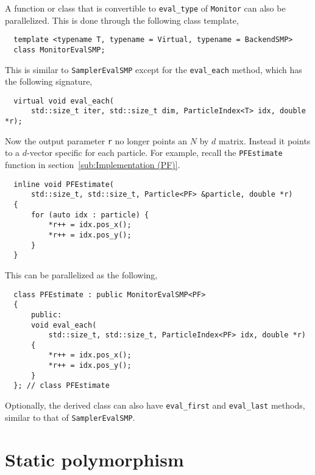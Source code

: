 A function or class that is convertible to \verb|eval_type| of \verb|Monitor|
can also be parallelized. This is done through the following class template,
\begin{Verbatim}
  template <typename T, typename = Virtual, typename = BackendSMP>
  class MonitorEvalSMP;
\end{Verbatim}
This is similar to \verb|SamplerEvalSMP| except for the \verb|eval_each|
method, which has the following signature,
\begin{Verbatim}
  virtual void eval_each(
      std::size_t iter, std::size_t dim, ParticleIndex<T> idx, double *r);
\end{Verbatim}
Now the output parameter \verb|r| no longer points an $N$ by $d$ matrix.
Instead it points to a $d$-vector specific for each particle. For example,
recall the \verb|PFEstimate| function in section~\ref{sub:Implementation (PF)}.
\begin{Verbatim}
  inline void PFEstimate(
      std::size_t, std::size_t, Particle<PF> &particle, double *r)
  {
      for (auto idx : particle) {
          *r++ = idx.pos_x();
          *r++ = idx.pos_y();
      }
  }
\end{Verbatim}
This can be parallelized as the following,
\begin{Verbatim}
  class PFEstimate : public MonitorEvalSMP<PF>
  {
      public:
      void eval_each(
          std::size_t, std::size_t, ParticleIndex<PF> idx, double *r)
      {
          *r++ = idx.pos_x();
          *r++ = idx.pos_y();
      }
  }; // class PFEstimate
\end{Verbatim}
Optionally, the derived class can also have \verb|eval_first| and
\verb|eval_last| methods, similar to that of \verb|SamplerEvalSMP|.

\section{Static polymorphism}
\label{sec:Static polymorphism}

